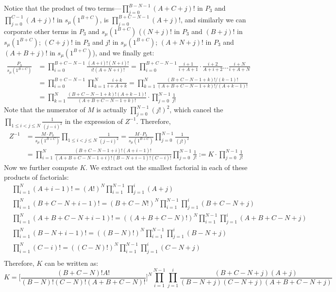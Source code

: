 \documentclass[12pt]{article}
\begin{document}
Notice that the product of two terms---$\prod_{j=0}^{B-N-1}(A+C+j)!$ in $P_{3}$ and $\prod_{j=0}^{C-1}(A+j)!$ in $s_{\mu}(1^{B+C})$, is $\prod_{j=0}^{B+C-N-1}(A+j)!$, and similarly we can corporate other terms in $P_{3}$ and $s_{\mu}(1^{B+C})$ ($(N+j)!$ in $P_{3}$ and $(B+j)!$ in $s_{\mu}(1^{B+C})$; $(C+j)!$ in $P_{3}$ and $j!$ in $s_{\mu}(1^{B+C})$; $(A+N+j)!$ in $P_{3}$ and $(A+B+j)!$ in $s_{\mu}(1^{B+C})$), and we finally get: 
\begin{align*}
	\frac{P_{3}}{s_{\mu}(1^{B+C})}&=\prod_{i=0}^{B+C-N-1}\frac{(A+i)!(N+i)!}{i!(A+N+i)!}=\prod_{i=0}^{B+C-N-1}\frac{i+1}{i+A+1}\cdot\frac{i+2}{A+i+2}\dots\frac{i+N}{i+A+N}\\
	&= \prod_{i=0}^{B+C-N-1}\prod_{k=1}^{N}\frac{i+k}{i+A+k}=\prod_{k=1}^{N}\frac{(B+C-N-1+k)!/(k-1)!}{(A+B+C-N-1+k)!/(A+k-1)!}\\ &= \prod_{k=1}^{N}\frac{(B+C-N-1+k)!(A+k-1)!}{(A+B+C-N-1+k)!}\cdot\prod_{j=0}^{N-1}\frac{1}{j!}
\end{align*}
Note that the numerator of $M$ is actually $\prod_{j=0}^{N-1}(j!)^{2}$, which cancel the $\prod_{1\leqslant i<j\leqslant N}\frac{1}{(j-i)^{2}}$ in the expression of $Z^{-1}$. Therefore, 
\begin{align*}
	Z^{-1}&=\frac{M\cdot P_{3}}{s_{\mu}(1^{B+C})}\prod_{1\leqslant i<j\leqslant N}\frac{1}{(j-i)^{2}}=\frac{M\cdot P_{3}}{s_{\mu}(1^{B+C})}\prod_{j=0}^{N-1}\frac{1}{(j!)^2}\\
	&= \prod_{i=1}^{N}\frac{(B+C-N-1+i)!(A+i-1)!}{(A+B+C-N-1+i)!(B-N+i-1)!(C-i)!}\prod_{j=0}^{N-1}\frac{1}{j!}:= K\cdot\prod_{j=0}^{N-1}\frac{1}{j!}
\end{align*}
Now we further compute $K$. We extract out the smallest factorial in each of these products of factorials:
\begin{align*}
	&\prod_{i=1}^{N}(A+i-1)!=(A!)^{N}\prod_{i=1}^{N-1}\prod_{j=1}^{i}(A+j)\\
	&\prod_{i=1}^{N}(B+C-N+i-1)!=(B+C-N!)^{N}\prod_{i=1}^{N-1}\prod_{j=1}^{i}(B+C-N+j)\\
	&\prod_{i=1}^{N}(A+B+C-N+i-1)!=((A+B+C-N)!)^{N}\prod_{i=1}^{N-1}\prod_{j=1}^{i}(A+B+C-N+j)\\
	&\prod_{i=1}^{N}(B-N+i-1)!=((B-N)!)^{N}\prod_{i=1}^{N-1}\prod_{j=1}^{i}(B-N+j)\\
	&\prod_{i=1}^{N}(C-i)!=((C-N)!)^{N}\prod_{i=1}^{N-1}\prod_{j=1}^{i}(C-N+j)\\
	\end{align*}
Therefore, $K$ can be written as: $$K=\Big[\frac{(B+C-N)!A!}{(B-N)!(C-N)!(A+B+C-N)!}\Big]^{N}\prod_{i=1}^{N-1}\prod_{j=1}^{i}\frac{(B+C-N+j)(A+j)}{(B-N+j)(C-N+j)(A+B+C-N+j)}$$
\end{document}
